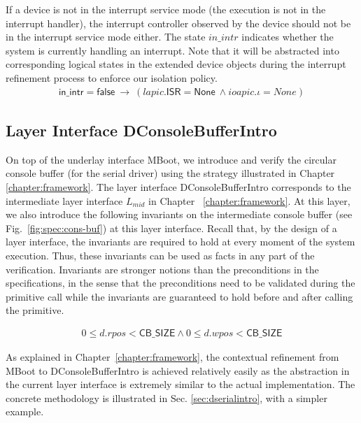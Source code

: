 \begin{invariant}
	If a device is not in the interrupt service mode (the execution is not in the
interrupt handler), the interrupt controller observed by the device should not
be in the interrupt service mode either. The state $in\_intr$ indicates whether
the system is currently handling an interrupt. Note that it will be abstracted
into corresponding logical states in the extended device objects during the
interrupt refinement process to enforce our isolation policy.
\[
\begin{array}{l}
\textsf{in\_intr} = \textsf{false} ~\rightarrow ~(lapic.\textsf{ISR} = \textsf{None} ~\wedge ioapic.\iota = None)
\end{array}
\]
\end{invariant}


\subsection{Layer Interface DConsoleBufferIntro}

On top of the underlay interface MBoot, we introduce and verify the circular
console buffer (for the serial driver) using the strategy illustrated in Chapter~
\ref{chapter:framework}. The layer interface DConsoleBufferIntro
corresponds to the intermediate layer interface $L_{mid}$ in Chapter~
\ref{chapter:framework}. At this layer, we also introduce the following
invariants on the intermediate console buffer (see Fig.~\ref{fig:spec:cons-buf})
at this layer interface. Recall that, by the design of a layer interface, the
invariants are required to hold at every moment of the system execution. Thus,
these invariants can be used as facts in any part of the verification.
Invariants are stronger notions than the preconditions in the specifications,
in the sense that the preconditions need to be validated during the primitive call while the
invariants are guaranteed to hold before and after calling the primitive.

\begin{invariant}
\begin{align*}
0 \leq d.rpos < \textsf{CB\_SIZE}
\wedge 0 \leq d.wpos < \textsf{CB\_SIZE}
\end{align*}
\end{invariant}

As explained in Chapter~\ref{chapter:framework}, the contextual
refinement from MBoot to DConsoleBufferIntro is achieved relatively easily as
the abstraction in the current layer interface is extremely similar to the
actual implementation. The concrete methodology is illustrated in Sec.
\ref{sec:dserialintro}, with a simpler example.

